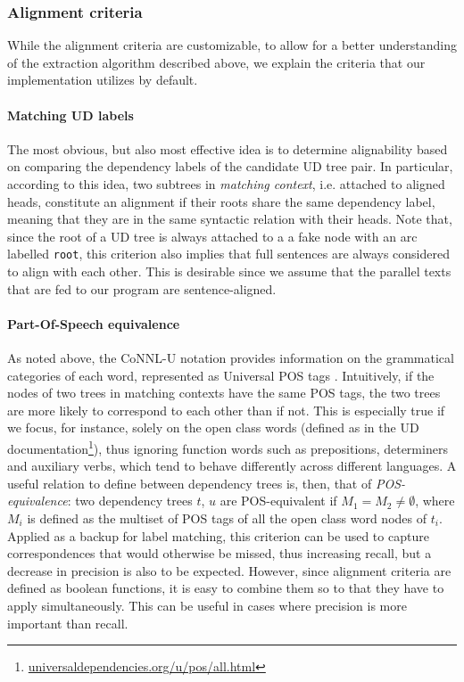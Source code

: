 \documentclass[11pt]{article}
\begin{document}
\subsubsection{Alignment criteria} \label{criteria}
While the alignment criteria are customizable, to allow for a better understanding of the extraction algorithm described above, we explain the criteria that our implementation utilizes by default.

\paragraph{Matching UD labels}
The most obvious, but also most effective idea is to determine alignability based on comparing the dependency labels of the candidate UD tree pair. 
In particular, according to this idea, two subtrees in \textit{matching context}, i.e. attached to aligned heads, constitute an alignment if their roots share the same dependency label, meaning that they are in the same syntactic relation with their heads.
Note that, since the root of a UD tree is always attached to a a fake node with an arc labelled \texttt{root}, this criterion also implies that full sentences are always considered to align with each other.
This is desirable since we assume that the parallel texts that are fed to our program are sentence-aligned.

\paragraph{Part-Of-Speech equivalence}
As noted above, the CoNNL-U notation provides information on the grammatical categories of each word, represented as Universal POS tags \cite{petrov-etal-2012-universal}. 
Intuitively, if the nodes of two trees in matching contexts have the same POS tags, the two trees are more likely to correspond to each other than if not. 
This is especially true if we focus, for instance, solely on the open class words (defined as in the UD documentation\footnote{\url{universaldependencies.org/u/pos/all.html}}), thus ignoring function words such as prepositions, determiners and auxiliary verbs, which tend to behave differently across different languages.
A useful relation to define between dependency trees is, then, that of \textit{POS-equivalence}: two dependency trees $t$, $u$ are POS-equivalent if $M_1 = M_2 \neq \emptyset$, where $M_i$ is defined as the multiset of POS tags of all the open class word nodes of $t_i$. 
Applied as a backup for label matching, this criterion can be used to capture correspondences that would otherwise be missed, thus increasing recall, but a decrease in precision is also to be expected. 
However, since alignment criteria are defined as boolean functions, it is easy to combine them so to that they have to apply simultaneously. This can be useful in cases where precision is more important than recall.
\end{document}
